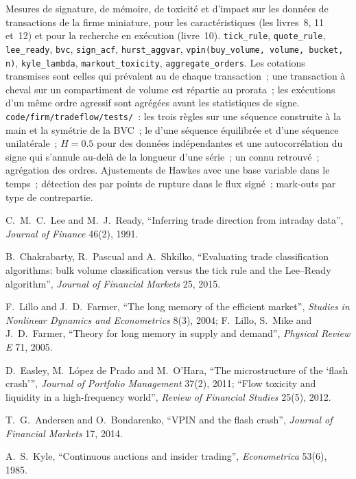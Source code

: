 \begin{build}
 Mesures de signature, de mémoire, de toxicité et d'impact sur les données de transactions de la firme miniature, pour les caractéristiques (les livres~8, 11 et~12) et pour
la recherche en exécution (livre~10).
 \texttt{tick\_rule}, \texttt{quote\_rule}, \texttt{lee\_ready}, \texttt{bvc}, \texttt{sign\_acf}, \texttt{hurst\_aggvar},
\texttt{vpin(buy\_volume, volume, bucket, n)}, \texttt{kyle\_lambda}, \texttt{markout\_toxicity}, \texttt{aggregate\_orders}.
 Les cotations transmises sont celles qui prévalent au  de chaque transaction~; une transaction à cheval sur un compartiment de volume est répartie
au prorata~; les exécutions d'un même ordre agressif sont agrégées avant les statistiques de signe.
 \texttt{code/firm/tradeflow/tests/}~: les trois règles sur une séquence construite à la main et la symétrie de la BVC~; le 
d'une séquence équilibrée et d'une séquence unilatérale~; $H = 0.5$ pour des données indépendantes et une autocorrélation du signe qui s'annule au-delà de la longueur d'une série~; un
 connu retrouvé~; agrégation des ordres.
 Ajustements de Hawkes avec une base variable dans le temps~; détection des  par points de rupture dans le flux signé~; mark-outs par
type de contrepartie.
\end{build}

\begin{omsources}
\item C.~M.~C.~Lee and M.~J.~Ready, ``Inferring trade direction from intraday data'', \emph{Journal of Finance} 46(2), 1991.
\item B.~Chakrabarty, R.~Pascual and A.~Shkilko, ``Evaluating trade classification algorithms: bulk volume classification versus the tick rule
and the Lee--Ready algorithm'', \emph{Journal of Financial Markets} 25, 2015.
\item F.~Lillo and J.~D.~Farmer, ``The long memory of the efficient market'', \emph{Studies in Nonlinear Dynamics and Econometrics} 8(3), 2004;
F.~Lillo, S.~Mike and J.~D.~Farmer, ``Theory for long memory in supply and demand'', \emph{Physical Review E} 71, 2005.
\item D.~Easley, M.~López de Prado and M.~O'Hara, ``The microstructure of the `flash crash''', \emph{Journal of Portfolio Management}
37(2), 2011; ``Flow toxicity and liquidity in a high-frequency world'', \emph{Review of Financial Studies} 25(5), 2012.
\item T.~G.~Andersen and O.~Bondarenko, ``VPIN and the flash crash'', \emph{Journal of Financial Markets} 17, 2014.
\item A.~S.~Kyle, ``Continuous auctions and insider trading'', \emph{Econometrica} 53(6), 1985.
\end{omsources}

